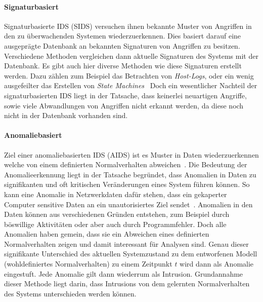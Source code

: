             \paragraph{Signaturbasiert} 
                Signaturbasierte IDS (SIDS) versuchen ihnen bekannte Muster von Angriffen 
                in den zu überwachenden Systemen wiederzuerkennen.
                Dies basiert darauf eine ausgeprägte Datenbank an bekannten Signaturen von Angriffen zu besitzen.
                Verschiedene Methoden vergleichen dann aktuelle Signaturen des Systems mit der Datenbank.
                Es gibt auch hier diverse Methoden wie diese Signaturen erstellt werden. 
                Dazu zählen zum Beispiel das Betrachten von \textit{Host-Logs},
                oder ein wenig ausgefeilter das Erstellen von \textit{State Machines}~\cite{SIDSstate}
                Doch ein wesentlicher Nachteil der signaturbasierten IDS liegt in der Tatsache,
                dass keinerlei neuartigen Angriffe, sowie viele Abwandlungen von Angriffen nicht erkannt werden,
                da diese noch nicht in der Datenbank vorhanden sind.~\cite{IDSsurvey}

            \paragraph{Anomaliebasiert}
                Ziel einer anomaliebasierten IDS (AIDS) ist es Muster in Daten wiederzuerkennen 
                welche von einem definierten Normalverhalten abweichen~\cite{ANOMALYSURVEY}.
                Die Bedeutung der Anomalieerkennung liegt in der Tatsache begründet,
                dass Anomalien in Daten zu signifikanten und oft kritischen Veränderungen eines System führen können. 
                So kann eine Anomalie in Netzwerkdaten dafür stehen,
                dass ein gekaperter Computer sensitive Daten an ein unautorisiertes Ziel sendet~\cite{ANOMALYEXAMPLE}.
                Anomalien in den Daten können aus verschiedenen Gründen entstehen,
                zum Beispiel durch böswillige Aktivitäten oder aber auch durch Programmfehler.
                Doch alle Anomalien haben gemein,
                dass sie ein Abweichen eines definierten Normalverhalten zeigen und damit interessant für Analysen sind.
                Genau dieser signifikante Unterschied des aktuellen Systemzustand zu dem entworfenen Modell
                (wohldefiniertes Normalverhalten) zu einem Zeitpunkt $t$ wird dann als Anomalie eingestuft.
                Jede Anomalie gilt dann wiederrum als Intrusion.
                Grundannahme dieser Methode liegt darin, dass Intrusions von dem gelernten Normalverhalten des Systems unterschieden werden können.

